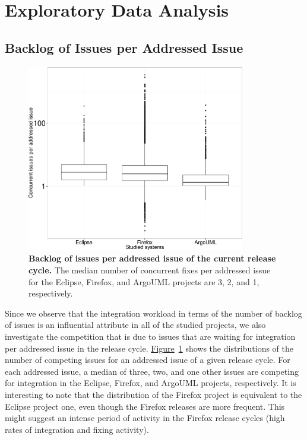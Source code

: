 \section{Exploratory Data Analysis} \label{ch4:exploratory}

\subsection{Backlog of Issues per Addressed Issue}

\begin{figure}
	\centering
	\includegraphics[width=0.85\textwidth,keepaspectratio]
	{chapters/chapter4/figures/boxplot-workloadratio-system.pdf}
	\caption{\textbf{Backlog of issues per addressed issue of the current
		release cycle.} The median number of concurrent fixes per addressed issue
	for the Eclipse, Firefox, and ArgoUML projects are 3, 2, and 1, respectively.}
	\label{ch4:fig:concurrent_issues}
\end{figure}

Since we observe that the integration workload in terms of the number of
backlog of issues is an influential attribute in all of the studied projects, we
also investigate the competition that is due to issues that are waiting for
integration per addressed issue in the release cycle.
\hyperref[ch4:fig:concurrent_issues]{Figure}~\ref{ch4:fig:concurrent_issues} shows the
distributions of the number of competing issues for an addressed issue of a
given release cycle. For each addressed issue, a median of three, two, and one
other issues are competing for integration in the Eclipse, Firefox, and ArgoUML
projects, respectively. It is interesting to note that the distribution of the
Firefox project is equivalent to the Eclipse project one, even though the
Firefox releases are more frequent. This might suggest an intense period of
activity in the Firefox release cycles (high rates of integration and fixing activity).

